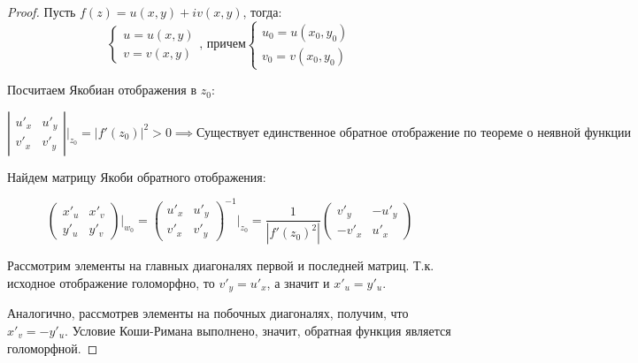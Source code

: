 \begin{proof}
    Пусть $f(z) = u(x, y) + iv(x, y)$, тогда:
    \begin{equation}
        \begin{cases}
            u = u(x, y)\\
            v = v(x, y)
        \end{cases}\text{, причем}
        \begin{cases}
            u_0 = u(x_0, y_0)\\
            v_0 = v(x_0, y_0)
        \end{cases}
    \end{equation}

    Посчитаем Якобиан отображения в $z_0$:

    \[
    \left|\begin{matrix} u'_x & u'_y \\ v'_x & v'_y \end{matrix}\right| \Bigg|_{z_0} = \left| f'(z_0) \right|^2 > 0 \implies \text{Существует единственное обратное отображение по теореме о неявной функции}
    \]

    Найдем матрицу Якоби обратного отображения:

    \[
    \begin{pmatrix} x'_u & x'_v \\ y'_u & y'_v \end{pmatrix} \Bigg|_{w_0} = \begin{pmatrix} u'_x & u'_y \\ v'_x & v'_y \end{pmatrix}^{-1} \Bigg|_{z_0} = \dfrac{1}{\left|f'(z_0)^2\right|}\begin{pmatrix} v'_y & -u'_y \\ -v'_x & u'_x \end{pmatrix}
    \]

    Рассмотрим элементы на главных диагоналях первой и последней матриц. Т.к. исходное отображение голоморфно, то $v'_y = u'_x$, а значит и $x'_u = y'_u$.

    Аналогично, рассмотрев элементы на побочных диагоналях, получим, что $x'_v = -y'_u$. Условие Коши-Римана выполнено, значит, обратная функция является голоморфной.
\end{proof}